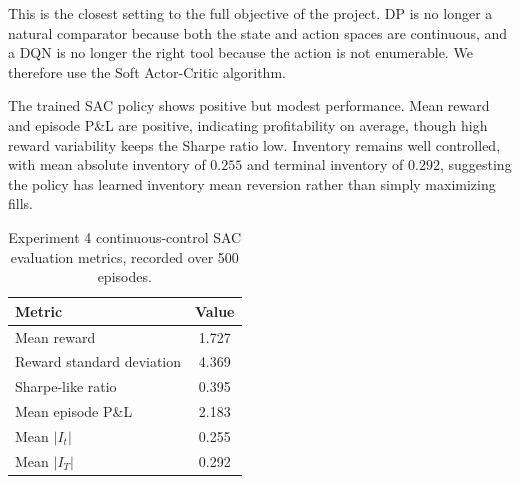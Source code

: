\documentclass[11pt,a4paper]{article}
\begin{document}
This is the closest setting to the full objective of the project. DP is no longer a natural comparator because both the state and action spaces are continuous, and a DQN is no longer the right tool because the action is not enumerable. We therefore use the Soft Actor-Critic algorithm.
\begin{table}[htbp]
\centering
\begin{minipage}{0.48\textwidth}

The trained SAC policy shows positive but modest performance. Mean reward and episode P\&L are positive, indicating profitability on average, though high reward variability keeps the Sharpe ratio low. Inventory remains well controlled, with mean absolute inventory of $0.255$ and terminal inventory of $0.292$, suggesting the policy has learned inventory mean reversion rather than simply maximizing fills.

\end{minipage}
\hfill
\begin{minipage}{0.48\textwidth}
\centering

\begin{tabular}{lc}
\toprule
Metric & Value \\
\midrule
Mean reward & 1.727 \\
Reward standard deviation & 4.369 \\
Sharpe-like ratio & 0.395 \\
Mean episode P\&L & 2.183 \\
Mean $|I_t|$ & 0.255 \\
Mean $|I_T|$ & 0.292 \\
\bottomrule
\end{tabular}
\caption{Experiment 4 continuous-control SAC evaluation metrics, recorded over 500 episodes.}
\label{tab:continuous_metrics}
\end{minipage}
\end{table}
\end{document}
